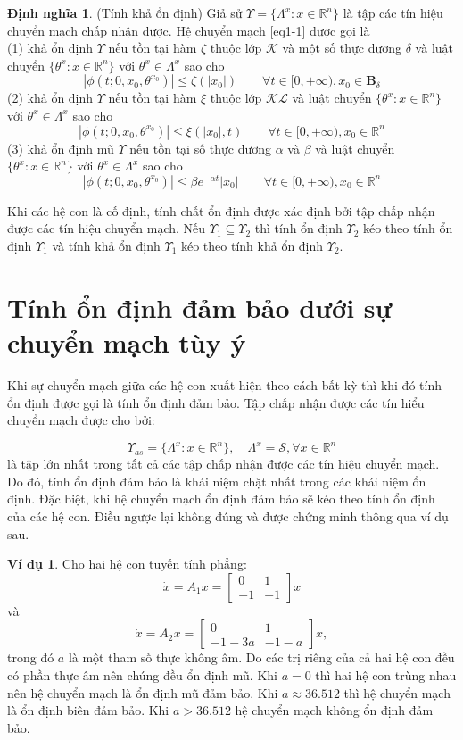 \documentclass[14pt,a4paper,oneside]{report}		%
\theoremstyle{definition}
\newtheorem{define}[theorem]{Định nghĩa}
\newtheorem{example}[theorem]{Ví dụ}
\begin{document}
\begin{define} (Tính khả ổn định) Giả sử $\Upsilon = \{\Lambda^x:x\in\mathbb{R}^n\}$ là tập các tín hiệu chuyển mạch chấp nhận được. Hệ chuyển mạch \ref{eq1-1} được gọi là \\
(1) khả ổn định $\Upsilon$ nếu tồn tại hàm $\zeta$ thuộc lớp $\mathcal{K}$ và một số thực dương $\delta$ và luật chuyển $\{\theta^x:x\in\mathbb{R}^n\}$ với $\theta^x\in\Lambda^x$ sao cho
$$|\phi(t;0,x_0,\theta^{x_0})|\leq\zeta(|x_0|)\qquad\forall t \in [0,+\infty ), x_0 \in\mathbf{B}_\delta$$
(2) khả ổn định $\Upsilon$ nếu tồn tại hàm $\xi$ thuộc lớp $\mathcal{KL}$ và luật chuyển $\{\theta^x:x\in\mathbb{R}^n\}$ với $\theta^x\in\Lambda^x$ sao cho
$$|\phi(t;0,x_0,\theta^{x_0})|\leq\xi(|x_0|,t)\qquad\forall t \in [0,+\infty ), x_0 \in\mathbb{R}^n$$
(3) khả ổn định mũ $\Upsilon$ nếu tồn tại số thực dương $\alpha$ và $\beta$ và luật chuyển $\{\theta^x:x\in\mathbb{R}^n\}$ với $\theta^x\in\Lambda^x$ sao cho
$$|\phi(t;0,x_0,\theta^{x_0})|\leq \beta e^{-\alpha t}|x_0|\qquad\forall t \in [0,+\infty ), x_0 \in\mathbb{R}^n$$
\end{define}

Khi các hệ con là cố định, tính chất ổn định được xác định bởi tập chấp nhận được các tín hiệu chuyển mạch. Nếu $\Upsilon_1\subseteq\Upsilon_2$ thì tính ổn định $\Upsilon_2$ kéo theo tính ổn định $\Upsilon_1$ và tính khả ổn định $\Upsilon_1$ kéo theo tính khả ổn định $\Upsilon_2$.

\section{Tính ổn định đảm bảo dưới sự chuyển mạch tùy ý}
Khi sự chuyển mạch giữa các hệ con xuất hiện theo cách bất kỳ thì khi đó tính ổn định được gọi là tính ổn định đảm bảo. Tập chấp nhận được các tín hiểu chuyển mạch được cho bởi:

$$\Upsilon_{as}=\{\Lambda^x:x\in\mathbb{R}^n\},\quad \Lambda^x=\mathcal{S},\forall x\in\mathbb{R}^n$$
là tập lớn nhất trong tất cả các tập chấp nhận được các tín hiệu chuyển mạch. Do đó, tính ổn định đảm bảo là khái niệm chặt nhất trong các khái niệm ổn định. Đặc biệt, khi hệ chuyển mạch ổn định đảm bảo sẽ kéo theo tính ổn định của các hệ con. Điều ngược lại không đúng và được chứng minh thông qua ví dụ sau.\\
\begin{example}
Cho hai hệ con tuyến tính phẳng:
$$\dot{x}=A_1x=
\begin{bmatrix}
0 & 1\\
-1 & -1
\end{bmatrix}x$$
và
$$\dot{x}=A_2x=
\begin{bmatrix}
0 & 1\\
-1-3a & -1-a
\end{bmatrix}x,$$
trong đó $a$ là một tham số thực không âm. Do các trị riêng của cả hai hệ con đều có phần thực âm nên chúng đều ổn định mũ. Khi $a=0$ thì hai hệ con trùng nhau nên hệ chuyển mạch là ổn định mũ đảm bảo. Khi $a\approx 36.512$ thì hệ chuyển mạch là ổn định biên đảm bảo. Khi $a>36.512$ hệ chuyển mạch không ổn định đảm bảo.
\end{example}
\end{document}
